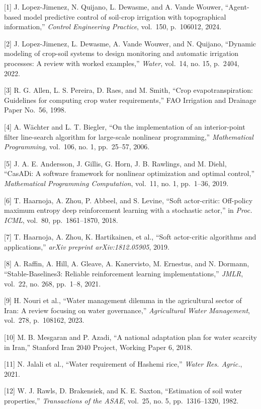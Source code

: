 {[}1{]} J. Lopez-Jimenez, N. Quijano, L. Dewasme, and A. Vande Wouwer,
``Agent-based model predictive control of soil-crop irrigation with
topographical information,'' \emph{Control Engineering Practice},
vol.~150, p.~106012, 2024.

{[}2{]} J. Lopez-Jimenez, L. Dewasme, A. Vande Wouwer, and N. Quijano,
``Dynamic modeling of crop-soil systems to design monitoring and
automatic irrigation processes: A review with worked examples,''
\emph{Water}, vol.~14, no. 15, p.~2404, 2022.

{[}3{]} R. G. Allen, L. S. Pereira, D. Raes, and M. Smith, ``Crop
evapotranspiration: Guidelines for computing crop water requirements,''
FAO Irrigation and Drainage Paper No.~56, 1998.

{[}4{]} A. Wächter and L. T. Biegler, ``On the implementation of an
interior-point filter line-search algorithm for large-scale nonlinear
programming,'' \emph{Mathematical Programming}, vol.~106, no. 1,
pp.~25--57, 2006.

{[}5{]} J. A. E. Andersson, J. Gillis, G. Horn, J. B. Rawlings, and M.
Diehl, ``CasADi: A software framework for nonlinear optimization and
optimal control,'' \emph{Mathematical Programming Computation}, vol.~11,
no. 1, pp.~1--36, 2019.

{[}6{]} T. Haarnoja, A. Zhou, P. Abbeel, and S. Levine, ``Soft
actor-critic: Off-policy maximum entropy deep reinforcement learning
with a stochastic actor,'' in \emph{Proc. ICML}, vol.~80,
pp.~1861--1870, 2018.

{[}7{]} T. Haarnoja, A. Zhou, K. Hartikainen, et al., ``Soft
actor-critic algorithms and applications,'' \emph{arXiv preprint
arXiv:1812.05905}, 2019.

{[}8{]} A. Raffin, A. Hill, A. Gleave, A. Kanervisto, M. Ernestus, and
N. Dormann, ``Stable-Baselines3: Reliable reinforcement learning
implementations,'' \emph{JMLR}, vol.~22, no. 268, pp.~1--8, 2021.

{[}9{]} H. Nouri et al., ``Water management dilemma in the agricultural
sector of Iran: A review focusing on water governance,''
\emph{Agricultural Water Management}, vol.~278, p.~108162, 2023.

{[}10{]} M. B. Mesgaran and P. Azadi, ``A national adaptation plan for
water scarcity in Iran,'' Stanford Iran 2040 Project, Working Paper 6,
2018.

{[}11{]} N. Jalali et al., ``Water requirement of Hashemi rice,''
\emph{Water Res. Agric.}, 2021.

{[}12{]} W. J. Rawls, D. Brakensiek, and K. E. Saxton, ``Estimation of
soil water properties,'' \emph{Transactions of the ASAE}, vol.~25, no.
5, pp.~1316--1320, 1982.

